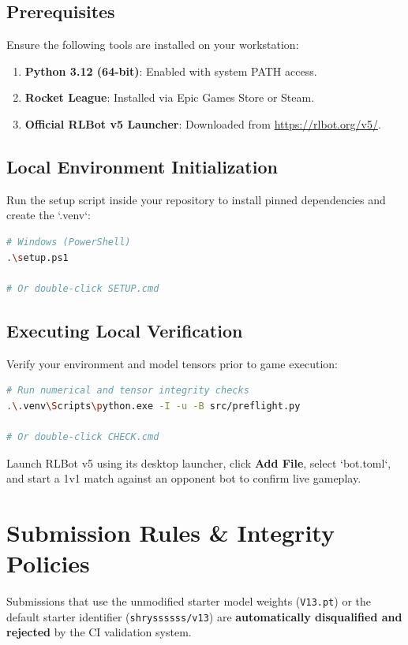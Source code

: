 \documentclass[11pt,a4paper]{article}
\begin{document}
\subsection{Prerequisites}
Ensure the following tools are installed on your workstation:
\begin{enumerate}[noitemsep]
    \item \textbf{Python 3.12 (64-bit)}: Enabled with system PATH access.
    \item \textbf{Rocket League}: Installed via Epic Games Store or Steam.
    \item \textbf{Official RLBot v5 Launcher}: Downloaded from \url{https://rlbot.org/v5/}.
\end{enumerate}

\subsection{Local Environment Initialization}
Run the setup script inside your repository to install pinned dependencies and create the `.venv`:
\begin{lstlisting}[language=bash]
# Windows (PowerShell)
.\setup.ps1

# Or double-click SETUP.cmd
\end{lstlisting}

\subsection{Executing Local Verification}
Verify your environment and model tensors prior to game execution:
\begin{lstlisting}[language=bash]
# Run numerical and tensor integrity checks
.\.venv\Scripts\python.exe -I -u -B src/preflight.py

# Or double-click CHECK.cmd
\end{lstlisting}

Launch RLBot v5 using its desktop launcher, click \textbf{Add File}, select `bot.toml`, and start a 1v1 match against an opponent bot to confirm live gameplay.

\section{Submission Rules \& Integrity Policies}

\begin{warningbox}
Submissions that use the unmodified starter model weights (\texttt{V13.pt}) or the default starter identifier (\texttt{shryssssss/v13}) are \textbf{automatically disqualified and rejected} by the CI validation system.
\end{warningbox}
\end{document}
